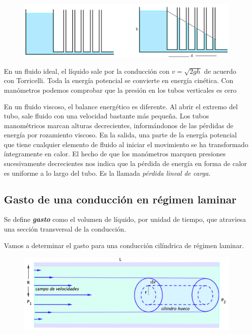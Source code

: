 \begin{figure}[H]
	\centering
	\includegraphics[width=.75\textwidth]{imagenes/imagenes18/T18IM13.png}
	\end{figure}

En un fluido ideal,  el líquido sale por la conducción con $v=\sqrt{2gh}$ de acuerdo con Torricelli. Toda la energía potencial se convierte en energía cinética. Con manómetros podemos comprobar que la presión en los tubos verticales es cero

En un fluido viscoso, el balance energético es diferente. Al abrir el extremo del tubo, sale fluido con una velocidad bastante más pequeña. Los tubos manométricos marcan alturas decrecientes, informándonos de las pérdidas de energía por rozamiento viscoso. En la salida, una parte de la energía potencial que tiene cualquier elemento de fluido al iniciar el movimiento se ha transformado íntegramente en calor. El hecho de que los manómetros marquen presiones sucesivamente decrecientes nos indica que la pérdida de energía en forma de calor es uniforme a lo largo del tubo. Es la llamada \emph{pérdida lineal de carga}.

\subsection{Gasto de una conducción en régimen laminar}

Se define \emph{\textbf{gasto}} como el volumen de líquido, por unidad de tiempo, que atraviesa una sección transversal de la conducción.

Vamos a determinar el gasto para una conducción cilíndrica de régimen laminar.

\begin{figure}[H]
	\centering
	\includegraphics[width=1\textwidth]{imagenes/imagenes18/T18IM14.png}
	\end{figure}

